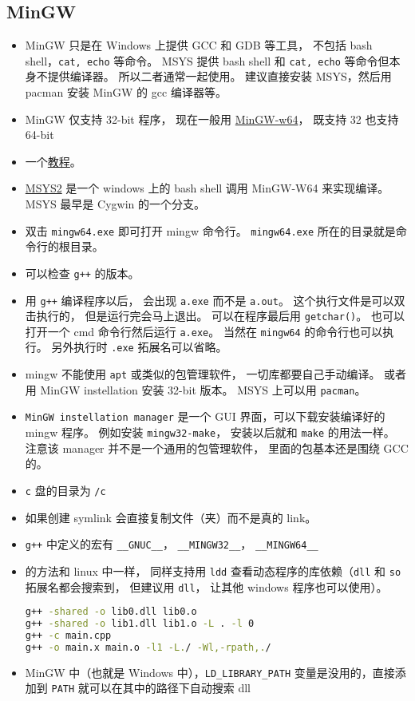 \subsection{MinGW}
\begin{itemize}
\item MinGW 只是在 Windows 上提供 GCC 和 GDB 等工具， 不包括 bash shell，\verb`cat, echo` 等命令。 MSYS 提供 bash shell 和 \verb`cat, echo` 等命令但本身不提供编译器。 所以二者通常一起使用。 建议直接安装 MSYS，然后用 pacman 安装 MinGW 的 gcc 编译器等。
\item MinGW 仅支持 32-bit 程序， 现在一般用 \href{https://www.mingw-w64.org/}{MinGW-w64}， 既支持 32 也支持 64-bit
\item 一个\href{https://www3.ntu.edu.sg/home/ehchua/programming/howto/Cygwin_HowTo.html}{教程}。
\item \href{https://www.msys2.org/}{MSYS2} 是一个 windows 上的 bash shell 调用 MinGW-W64 来实现编译。 MSYS 最早是 Cygwin 的一个分支。
\item 双击 \verb`mingw64.exe` 即可打开 mingw 命令行。 \verb`mingw64.exe` 所在的目录就是命令行的根目录。
\item 可以检查 \verb`g++` 的版本。
\item 用 \verb`g++` 编译程序以后， 会出现 \verb`a.exe` 而不是 \verb`a.out`。 这个执行文件是可以双击执行的， 但是运行完会马上退出。 可以在程序最后用 \verb`getchar()`。 也可以打开一个 cmd 命令行然后运行 \verb`a.exe`。 当然在 \verb`mingw64` 的命令行也可以执行。 另外执行时 \verb`.exe` 拓展名可以省略。
\item mingw 不能使用 \verb`apt` 或类似的包管理软件， 一切库都要自己手动编译。 或者用 MinGW instellation 安装 32-bit 版本。 MSYS 上可以用 \verb`pacman`。
\item \verb`MinGW instellation manager` 是一个 GUI 界面，可以下载安装编译好的 mingw 程序。 例如安装 \verb`mingw32-make`， 安装以后就和 \verb`make` 的用法一样。 注意该 manager 并不是一个通用的包管理软件， 里面的包基本还是围绕 GCC 的。
\item \verb`c` 盘的目录为 \verb`/c`
\item 如果创建 symlink 会直接复制文件（夹）而不是真的 link。
\item \verb`g++` 中定义的宏有 \verb`__GNUC__`， \verb`__MINGW32__`， \verb`__MINGW64__`
\item {}的方法和 linux 中一样， 同样支持用 \verb`ldd` 查看动态程序的库依赖（\verb`dll` 和 \verb`so` 拓展名都会搜索到， 但建议用 \verb`dll`， 让其他 windows 程序也可以使用）。
\begin{lstlisting}[language=bash]
g++ -shared -o lib0.dll lib0.o
g++ -shared -o lib1.dll lib1.o -L . -l 0
g++ -c main.cpp
g++ -o main.x main.o -l1 -L./ -Wl,-rpath,./
\end{lstlisting}
\item MinGW 中（也就是 Windows 中），\verb`LD_LIBRARY_PATH` 变量是没用的，直接添加到 \verb`PATH` 就可以在其中的路径下自动搜索 dll
\end{itemize}

